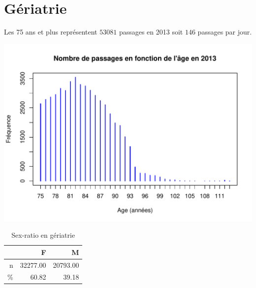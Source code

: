 \documentclass[12pt,english,french,twoside]{book}\usepackage[]{graphicx}\usepackage[]{color}
\makeatletter
\def\maxwidth{ %
  \ifdim\Gin@nat@width>\linewidth
    \linewidth
  \else
    \Gin@nat@width
  \fi
}
\newenvironment{knitrout}{}{} %
\makeatother
\begin{document}
\chapter{Gériatrie}


\label{chap_geriatrie}



Les 75 ans et plus représentent $53 081$ passages en 2013 soit $146$ passages par jour.


\begin{knitrout}
\color{fgcolor}
\includegraphics[width=\maxwidth]{figure/passages_geriatrie-1} 

\end{knitrout}


\begin{table}[ht]
\centering
\begin{tabular}{rrr}
  \hline
 & F & M \\ 
  \hline
n & 32277.00 & 20793.00 \\ 
  \% & 60.82 & 39.18 \\ 
   \hline
\end{tabular}
\caption[Sex-ratio en gériatrie]{Sex-ratio en gériatrie} 
\label{tab:ger_sr}
\end{table}


\end{document}

